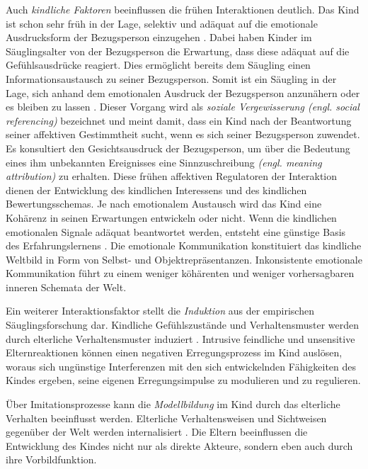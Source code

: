 Auch \textit{kindliche Faktoren} beeinflussen die frühen Interaktionen deutlich. Das Kind ist schon sehr früh in der Lage, selektiv und adäquat auf die emotionale Ausdrucksform der Bezugsperson einzugehen \cite{Harris1994}. Dabei haben Kinder im Säuglingsalter von der Bezugsperson die Erwartung, dass diese adäquat auf die Gefühlsausdrücke reagiert. Dies ermöglicht bereits dem Säugling einen Informationsaustausch zu seiner Bezugsperson. Somit ist ein Säugling in der Lage, sich anhand dem emotionalen Ausdruck der Bezugsperson anzunähern oder es bleiben zu lassen \cite{Resch1999}. Dieser Vorgang wird als \textit{soziale Vergewisserung (engl. social referencing)} bezeichnet und meint damit, dass ein Kind nach der Beantwortung seiner affektiven Gestimmtheit sucht, wenn es sich seiner Bezugsperson zuwendet. Es konsultiert den Gesichtsausdruck der Bezugsperson, um über die Bedeutung eines ihm unbekannten Ereignisses eine Sinnzuschreibung \textit{(engl. meaning attribution)} zu erhalten. Diese frühen affektiven Regulatoren der Interaktion dienen der Entwicklung des kindlichen Interessens und des kindlichen Bewertungsschemas. Je nach emotionalem Austausch wird das Kind eine Kohärenz in seinen Erwartungen entwickeln oder nicht. Wenn die kindlichen emotionalen Signale adäquat beantwortet werden, entsteht eine günstige Basis des Erfahrungslernens \cite[S.~95]{Resch1999}. Die emotionale Kommunikation konstituiert das kindliche Weltbild in Form von Selbst- und Objektrepräsentanzen. Inkonsistente emotionale Kommunikation führt zu einem weniger köhärenten und weniger vorhersagbaren inneren Schemata der Welt. 

Ein weiterer Interaktionsfaktor stellt die \textit{Induktion} aus der empirischen Säuglingsforschung dar. Kindliche Gefühlszustände und Verhaltensmuster werden durch elterliche Verhaltensmuster induziert \cite{Cummings1994}. Intrusive feindliche und unsensitive Elternreaktionen können einen negativen Erregungsprozess im Kind auslösen, woraus sich ungünstige Interferenzen mit den sich entwickelnden Fähigkeiten des Kindes ergeben, seine eigenen Erregungsimpulse zu modulieren und zu regulieren.  

Über Imitationsprozesse kann die \textit{Modellbildung} im Kind durch das elterliche Verhalten beeinflusst werden. Elterliche Verhaltensweisen und Sichtweisen gegenüber der Welt werden internalisiert \cite{Resch1999}. Die Eltern beeinflussen die Entwicklung des Kindes nicht nur als direkte Akteure, sondern eben auch durch ihre Vorbildfunktion. 

